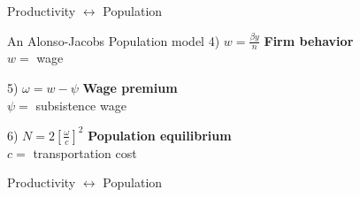 \documentclass[]{beamer} %
\begin{document}
\begin{frame}{}
  \centering 
  {\Huge Productivity  $\longleftrightarrow$ Population}
\end{frame}



\begin{frame}{An Alonso-Jacobs Population model}%
\huge 
4) $w=\frac{\beta y} {n}$ { \hfill\Large \textbf{Firm behavior}\\\hfill \normalsize$ w =$ wage}
\vspace{.5cm}

5) $\omega=w-\psi$ { \hfill\large  \textbf{Wage premium}\\\hfill\Large $ \psi=$ subsistence wage}
\vspace{.5cm}

{\color{green!50!black}6) $N= 2\left[\frac{\omega}{c}\right]^2$ { \hfill \textbf{\Large  Population equilibrium}}\\
\normalsize \hfill $ c=$ transportation cost}

\end{frame}



\begin{frame}{}
  \centering 
  {\Huge Productivity  $\longleftrightarrow$ Population}
\end{frame}
\end{document}
